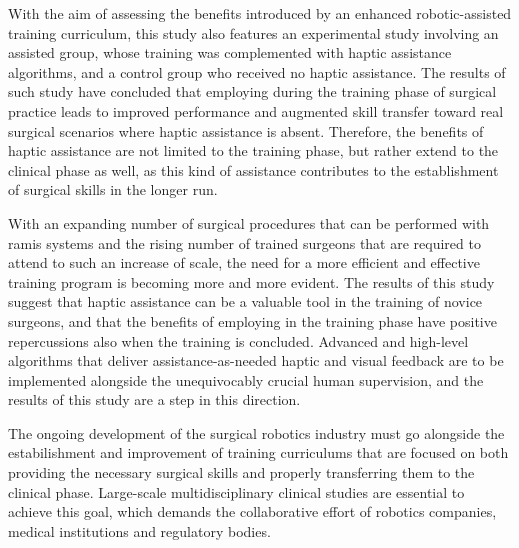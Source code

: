 \documentclass[../main.tex]{subfiles}
\begin{document}
With the aim of assessing the benefits introduced by an enhanced robotic-assisted training curriculum, this study also features an experimental study involving an assisted group, whose training was complemented with haptic assistance algorithms, and a control group who received no haptic assistance. 
The results of such study have concluded that employing \vfs during the training phase of surgical practice leads to improved performance and augmented skill transfer toward real surgical scenarios where haptic assistance is absent. Therefore, the benefits of haptic assistance are not limited to the training phase, but rather extend to the clinical phase as well, as this kind of assistance contributes to the establishment of surgical skills in the longer run.  

With an expanding number of surgical procedures that can be performed with \ac{ramis} systems and the rising number of trained surgeons that are required to attend to such an increase of scale, the need for a more efficient and effective training program is becoming more and more evident. The results of this study suggest that haptic assistance can be a valuable tool in the training of novice surgeons, and that the benefits of employing \vfs in the training phase have positive repercussions also when the training is concluded. Advanced and high-level algorithms that deliver assistance-as-needed haptic and visual feedback are to be implemented alongside the unequivocably crucial human supervision, and the results of this study are a step in this direction. 

The ongoing development of the surgical robotics industry must go alongside the estabilishment and improvement of training curriculums that are focused on both providing the necessary surgical skills and properly transferring them to the clinical phase. Large-scale multidisciplinary clinical studies are essential to achieve this goal, which demands the collaborative effort of robotics companies, medical institutions and regulatory bodies. 


% 
% 
\end{document}

